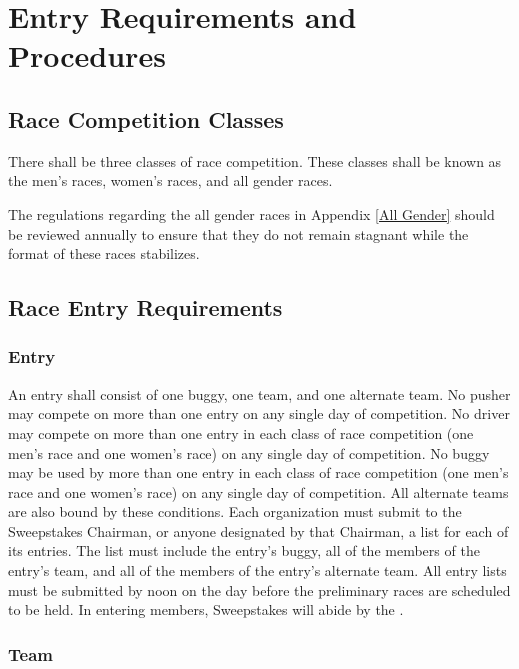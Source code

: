 \chapter{Entry Requirements and Procedures}

\section{Race Competition Classes}

	There shall be three classes of race competition. These classes shall be known as the men's races, women's races, and all gender races. 

    The regulations regarding the all gender races in Appendix \ref*{All Gender} should be reviewed annually to ensure that they do not remain stagnant while the format of these races stabilizes.


\section{Race Entry Requirements}

\subsection{Entry}

An entry shall consist of one buggy, one team, and one alternate team. No pusher may compete on more than one entry on any single day of competition. No driver may compete on more than one entry in each class of race competition (one men's race and one women's race) on any single day of competition. No buggy may be used by more than one entry in each class of race competition (one men's race and one women's race) on any single day of competition. All alternate teams are also bound by these conditions. Each organization must submit to the Sweepstakes Chairman, or anyone designated by that Chairman, a list for each of its entries. The list must include the entry's buggy, all of the members of the entry's team, and all of the members of the entry's alternate team. All entry lists must be submitted by noon on the day before the preliminary races are scheduled to be held. In entering members, Sweepstakes will abide by the .

\subsection{Team}

